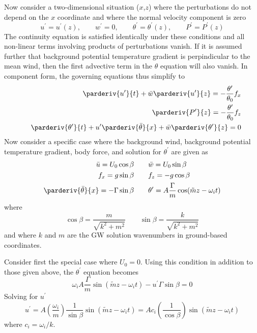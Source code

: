 \documentclass[12pt]{article}
\begin{document}
Now consider a two-dimensional situation ($x$,$z$) where the perturbations
do not depend on the $x$ coordinate and where the normal velocity component
is zero
%
\begin{equation}
u^\prime = u^\prime(z), \quad\quad w^\prime = 0, \quad\quad 
\theta^\prime = \theta^\prime(z), \quad\quad P^\prime = P^\prime(z)
\label{solution:form}
\end{equation}
%
The continuity equation is satisfied identically under these conditions and
all non-linear terms involving products of perturbations vanish.  If it 
is assumed further that background potential temperature gradient is 
perpindicular to the mean wind, then the first advective term in the $\theta$
equation will also vanish.  In component form, the governing equations
thus simplify to
%
\begin{eqnarray}
& & \parderiv{u^\prime}{t} + \bar{w}\parderiv{u^\prime}{z} =
-\frac{\theta^\prime}{\theta_0} f_x\\
& & \parderiv{P^\prime}{z} = -\frac{\theta^\prime}{\theta_0} f_z\\
& & \parderiv{\theta^\prime}{t} + 
u^\prime\parderiv{\bar{\theta}}{x} +
\bar{w}\parderiv{\theta^\prime}{z} = 0
\label{simplified}
\end{eqnarray}
%
Now consider a specific case where the background wind, background
potential temperature gradient, body force, and solution for $\theta^\prime$
are given as
%
\begin{eqnarray}
\bar{u} = U_0\cos\beta \quad & \quad \bar{w} = U_0\sin\beta\\
f_x = g\sin\beta \quad & \quad f_z = -g\cos\beta\\
\parderiv{\bar{\theta}}{x} = -\Gamma\sin\beta \quad & \quad
\theta^\prime = A\frac{\Gamma}{m}\cos(\tilde{m}z-\omega_i t)
\end{eqnarray}
%
where 
%
\begin{equation}
\cos\beta = \frac{m}{\sqrt{k^2+m^2}} \qquad 
\sin\beta = \frac{k}{\sqrt{k^2+m^2}}
\end{equation}
%
and where $k$ and $m$ are the GW solution wavenumbers in ground-based 
coordinates.

Consider first the special case where $U_0=0$.  Using this condition
in addition to those given above, the $\theta^\prime$ equation becomes
%
\begin{equation}
\omega_i A\frac{\Gamma}{m}\sin(\tilde{m}z-\omega_i t) - 
u^\prime\Gamma\sin\beta = 0
\label{thet}
\end{equation}
%
Solving for $u^\prime$
%
\begin{equation}
u^\prime = A\left(\frac{\omega_i}{m}\right)\frac{1}{\sin\beta}
           \sin(\tilde{m}z-\omega_i t) =
A c_i \left(\frac{1}{\cos\beta}\right)\sin(\tilde{m}z-\omega_i t)
\label{uprime}
\end{equation}
%
where $c_i = \omega_i/k$.
\end{document}
